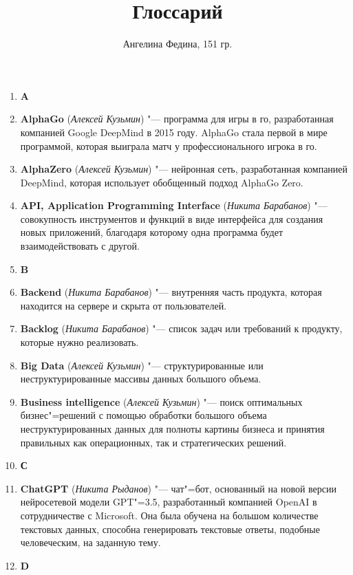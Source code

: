 \documentclass[a4paper, 14 pt]{extarticle}
\title{\textbf{Глоссарий}}
\author{Ангелина Федина, 151 гр.}
\date{}
\begin{document}
\maketitle
\thispagestyle{empty}
\pagestyle{empty}

\begin{enumerate}
    \item[] \large{\textbf{A}}
    \item \textbf{AlphaGo} (\textit{Алексей Кузьмин}) "--- программа для игры в 
    го, разработанная компанией Google DeepMind в 2015 году. AlphaGo стала 
    первой в мире программой, которая выиграла матч у профессионального игрока
    в го.
    \item \textbf{AlphaZero} (\textit{Алексей Кузьмин}) "--- нейронная сеть, 
    разработанная компанией DeepMind, которая использует обобщенный подход 
    AlphaGo Zero.
    \item \textbf{API, Application Programming Interface} 
    (\textit{Никита Барабанов}) "--- совокупность инструментов и функций в 
    виде интерфейса для создания новых приложений, благодаря которому одна 
    программа будет взаимодействовать с другой. 
    \item[] \textbf{B}
    \item \textbf{Backend} (\textit{Никита Барабанов}) "--- внутренняя часть 
    продукта, которая находится на сервере и скрыта от пользователей.
    \item \textbf{Backlog} (\textit{Никита Барабанов}) "--- список задач или 
    требований к продукту, которые нужно реализовать.
    \item \textbf{Big Data} (\textit{Алексей Кузьмин}) "--- 
    структурированные или неструктурированные массивы данных большого объема.
    \item \textbf{Business intelligence} (\textit{Алексей Кузьмин}) "--- поиск 
    оптимальных бизнес"=решений с помощью обработки большого объема 
    неструктурированных данных для полноты картины бизнеса и принятия правильных
    как операционных, так и стратегических решений.
    \item[] \textbf{С}
    \item \textbf{ChatGPT} (\textit{Никита Рыданов}) "--- чат"=бот, основанный 
    на новой версии нейросетевой модели GPT"=3.5, разработанный компанией OpenAI 
    в сотрудничестве с Microsoft. Она была обучена на большом количестве 
    текстовых данных, способна генерировать текстовые ответы, подобные 
    человеческим, на заданную тему.  
    \item[] \textbf{D}

\end{enumerate}
\end{document}
